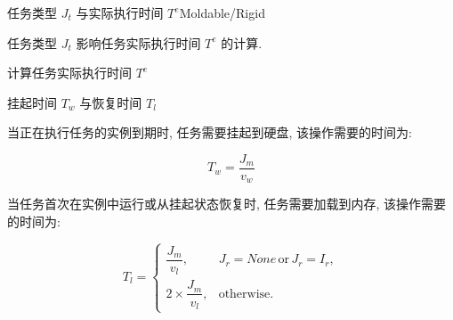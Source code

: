\begin{frame}[fragile]{任务类型 $J_t$ 与实际执行时间 $T^e$}{Moldable/Rigid}

    任务类型 $J_t$ 影响任务实际执行时间 $T^e$ 的计算.

    \centering
    \begin{minipage}{0.7\textwidth}
        \IncMargin{1.5em}
        \begin{algorithm}[H]
            \SetAlgoLined
            \caption{计算任务实际执行时间 $T^e$}
        \end{algorithm}
        \DecMargin{1.5em}
    \end{minipage}

\end{frame}

\begin{frame}{挂起时间 $T_w$ 与恢复时间 $T_l$}

    当正在执行任务的实例到期时, 任务需要挂起到硬盘, 该操作需要的时间为:

    \begin{equation*}
        T_w = \frac{J_m}{v_w}
    \end{equation*}

    当任务首次在实例中运行或从挂起状态恢复时, 任务需要加载到内存, 该操作需要的时间为:

    \begin{equation*}
        T_l = \begin{cases}
            \dfrac{J_m}{v_l},          & J_r = None \, \text{or} \, J_r = I_r, \\
            2 \times \dfrac{J_m}{v_l}, & \text{otherwise}.
        \end{cases}
    \end{equation*}

\end{frame}
